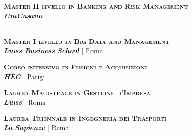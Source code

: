 \begin{minipage}[t]{0.58\textwidth}


\textsc{\textbf{Master II livello in Banking and Risk Management}} \\ 
\textbf{\textit{UniCusano}} %
\\
 \\

\is
\textsc{\textbf{Master I livello in Big Data and Management}} \\ 
\textbf{\textit{Luiss Business School}} | Roma  %
\\

\is
\textsc{\textbf{Corso intensivo in Fusioni e Acquisizioni}} \\ 
\textbf{\textit{HEC}} | Parigi  %

\is
\textsc{\textbf{Laurea Magistrale in Gestione d'Impresa}} \\ 
\textbf{\textit{Luiss}} | Roma  %
\\

\is
\textsc{\textbf{Laurea Triennale in Ingegneria dei Trasporti}} \\ 
\textbf{\textit{La Sapienza}} | Roma  %
\\


\end{minipage}